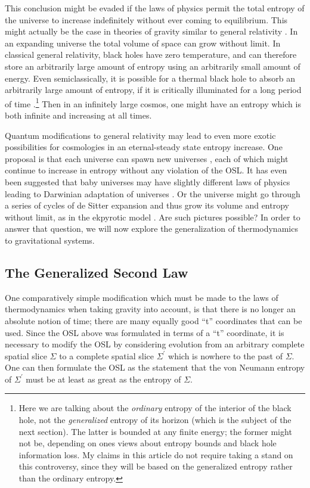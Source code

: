 \documentclass[12pt]{article}
\begin{document}
This conclusion might be evaded if the laws of physics permit the total entropy of the universe to increase indefinitely without ever coming to equilibrium.  This might actually be the case in theories of gravity similar to general relativity \cite{carroll}.   In an expanding universe the total volume of space can grow without limit.  In classical general relativity, black holes have zero temperature, and can therefore store an arbitrarily large amount of entropy using an arbitrarily small amount of energy.  Even semiclassically, it is possible for a thermal black hole to absorb an arbitrarily large amount of entropy, if it is critically illuminated for a long period of time \cite{FPST}.\footnote{Here we are talking about the \emph{ordinary} entropy of the interior of the black hole, not the \emph{generalized} entropy of its horizon (which is the subject of the next section).  The latter is bounded at any finite energy; the former might not be, depending on ones views about entropy bounds and black hole information loss.  My claims in this article do not require taking a stand on this controversy, since they will be based on the generalized entropy rather than the ordinary entropy.}  Then in an infinitely large cosmos, one might have an entropy which is both infinite and increasing at all times.

Quantum modifications to general relativity may lead to even more exotic possibilities for cosmologies in an eternal-steady state entropy increase.  One proposal is that each universe can spawn new universes \cite{babies, FMM}, each of which might continue to increase in entropy without any violation of the OSL.  It has even been suggested that baby universes may have slightly different laws of physics leading to Darwinian adaptation of universes \cite{smolin}.  Or the universe might go through a series of cycles of de Sitter expansion and thus grow its volume and entropy without limit, as in the ekpyrotic model \cite{ek}.  Are such pictures possible?  In order to answer that question, we will now explore the generalization of thermodynamics to gravitational systems.

\subsection{The Generalized Second Law}\label{GSL}

One comparatively simple modification which must be made to the laws of thermodynamics when taking gravity into account, is that there is no longer an absolute notion of time; there are many equally good ``t'' coordinates that can be used.  Since the OSL above was formulated in terms of a ``t'' coordinate, it is necessary to modify the OSL by considering evolution from an arbitrary complete spatial slice $\Sigma$ to a complete spatial slice $\Sigma^\prime$ which is nowhere to the past of $\Sigma$.  One can then formulate the OSL as the statement that the von Neumann entropy of $\Sigma^\prime$ must be at least as great as the entropy of $\Sigma$.
\end{document}
